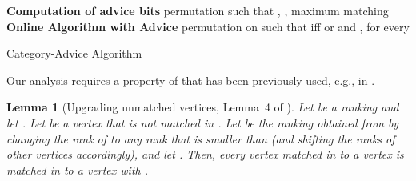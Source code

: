 \documentclass[a4paper]{article}
\newtheorem{lemma}{Lemma}
\begin{document}
\begin{algorithm}
 \begin{algorithmic}
  \STATE \textbf{Computation of advice bits}
  \STATE  permutation such that , ,  maximum matching
   \STATE 
  \STATE \textbf{Online Algorithm with Advice} 
  \STATE  permutation on  such that  iff  or   and , for every 
  \RETURN 
 \end{algorithmic}
\caption{Category-Advice Algorithm \label{alg:advice-category}}
\end{algorithm}

Our analysis requires a property of  that has been previously used, e.g., in \cite{bm08}.
 \begin{lemma}[Upgrading unmatched vertices, Lemma~4 of \cite{bm08}] \label{lem:upgrade}
  Let  be a ranking and let . Let  be a vertex that is not matched in .
  Let  be the ranking obtained from  by changing the rank of  to any rank that is smaller
  than  (and shifting the ranks of other vertices accordingly), and let
  . Then, every vertex  matched in  to a vertex 
  is matched in  to a vertex  with .
 \end{lemma}
\end{document}
